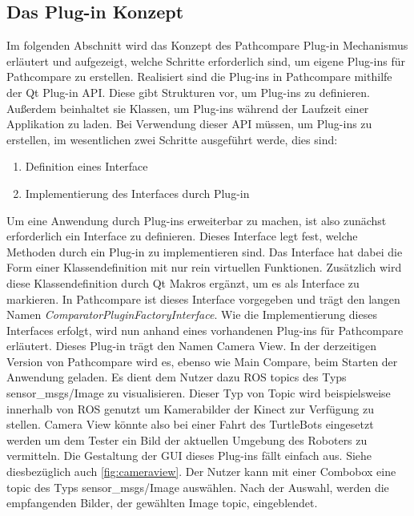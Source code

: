 \subsection{Das Plug-in Konzept}
Im folgenden Abschnitt wird das Konzept des Pathcompare Plug-in Mechanismus
erläutert und aufgezeigt, welche Schritte erforderlich sind, um eigene Plug-ins
für Pathcompare zu erstellen. Realisiert sind die Plug-ins in Pathcompare
mithilfe der Qt Plug-in API. Diese gibt Strukturen vor, um Plug-ins zu
definieren. Außerdem beinhaltet sie Klassen, um Plug-ins während der Laufzeit
einer Applikation zu laden.  Bei Verwendung dieser API müssen, um Plug-ins zu
erstellen, im wesentlichen zwei Schritte ausgeführt werde, dies sind:

\begin{enumerate}
  \item Definition eines Interface
  \item Implementierung des Interfaces durch Plug-in
\end{enumerate}

Um eine Anwendung durch Plug-ins erweiterbar zu machen, ist also zunächst
erforderlich ein Interface zu definieren. Dieses Interface legt fest, welche
Methoden durch ein Plug-in zu implementieren sind. Das Interface hat dabei die
Form einer Klassendefinition mit nur rein virtuellen Funktionen. Zusätzlich
wird diese Klassendefinition durch Qt Makros ergänzt, um es als Interface zu
markieren. In Pathcompare ist dieses Interface vorgegeben und trägt den langen
Namen \textit{ComparatorPluginFactoryInterface}. Wie die Implementierung dieses
Interfaces erfolgt, wird nun anhand eines vorhandenen Plug-ins für Pathcompare
erläutert.  Dieses Plug-in trägt den Namen Camera View. In der derzeitigen
Version von Pathcompare wird es, ebenso wie Main Compare, beim Starten der
Anwendung geladen.  Es dient dem Nutzer dazu ROS topics des Typs
sensor\_msgs/Image zu visualisieren. Dieser Typ von Topic wird beispielsweise
innerhalb von ROS genutzt um Kamerabilder der Kinect zur Verfügung zu stellen.
Camera View könnte also bei einer Fahrt des TurtleBots eingesetzt werden um dem
Tester ein Bild der aktuellen Umgebung des Roboters zu vermitteln. Die
Gestaltung der GUI dieses Plug-ins fällt einfach aus. Siehe diesbezüglich auch
\autoref{fig:cameraview}. Der Nutzer kann mit einer
Combobox eine topic des Typs sensor\_msgs/Image auswählen. Nach der Auswahl, werden die empfangenden
Bilder, der gewählten Image topic, eingeblendet. 

